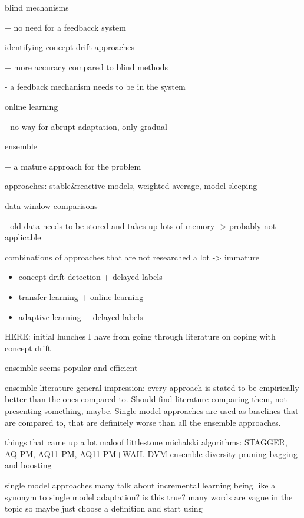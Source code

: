 blind mechanisms

+ no need for a feedbacck system

identifying concept drift approaches

+ more accuracy compared to blind methods \cite{conceptdriftsurvey}

- a feedback mechanism needs to be in the system

online learning

- no way for abrupt adaptation, only gradual \cite{conceptdriftsurvey}

ensemble

+ a mature approach for the problem \cite{mlforstreamingsurvey}

approaches: stable&reactive models, weighted average, model sleeping \cite{conceptdriftsurvey}

data window comparisons

- old data needs to be stored and takes up lots of memory \cite{conceptdriftsurvey} -> probably not applicable

combinations of approaches that are not researched a lot -> immature

\begin{itemize}
    \item concept drift detection + delayed labels \cite{mlforstreamingsurvey}
    \item transfer learning + online learning \cite{mlforstreamingsurvey}
    \item adaptive learning + delayed labels \cite{mlforstreamingsurvey}
\end{itemize}

HERE: initial hunches I have from going through literature on coping with concept drift

ensemble seems popular and efficient

ensemble literature general impression: every approach is stated to be empirically better than the ones compared to. Should find literature comparing them, not presenting something, maybe. Single-model approaches are used as baselines that are compared to, that are definitely worse than all the ensemble approaches.

things that came up a lot
maloof
littlestone
michalski
algorithms: STAGGER, AQ-PM, AQ11-PM, AQ11-PM+WAH. DVM
ensemble diversity
pruning
bagging and boosting

single model approaches
many talk about incremental learning being like a synonym to single model adaptation? is this true? many words are vague in the topic so maybe just choose a definition and start using

